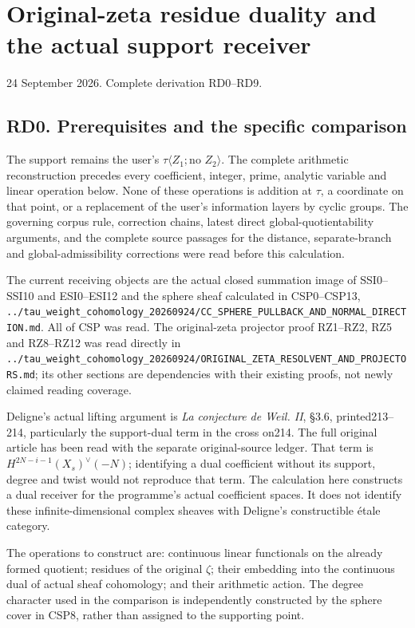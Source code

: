 \section{Original-zeta residue duality and the actual support
receiver}\label{original-zeta-residue-duality-and-the-actual-support-receiver}

24 September 2026. Complete derivation RD0--RD9.

\subsection{RD0. Prerequisites and the specific
comparison}\label{rd0.-prerequisites-and-the-specific-comparison}

The support remains the user's \(\tau\langle Z_1;\text{no }Z_2\rangle\).
The complete arithmetic reconstruction precedes every coefficient,
integer, prime, analytic variable and linear operation below. None of
these operations is addition at \(\tau\), a coordinate on that point, or
a replacement of the user's information layers by cyclic groups. The
governing corpus rule, correction chains, latest direct
global-quotientability arguments, and the complete source passages for
the distance, separate-branch and global-admissibility corrections were
read before this calculation.

The current receiving objects are the actual closed summation image of
SSI0--SSI10 and ESI0--ESI12 and the sphere sheaf calculated in
CSP0--CSP13,
\nolinkurl{../tau_weight_cohomology_20260924/CC_SPHERE_PULLBACK_AND_NORMAL_DIRECTION.md}.
All of CSP was read. The original-zeta projector proof RZ1--RZ2, RZ5 and
RZ8--RZ12 was read directly in
\nolinkurl{../tau_weight_cohomology_20260924/ORIGINAL_ZETA_RESOLVENT_AND_PROJECTORS.md};
its other sections are dependencies with their existing proofs, not
newly claimed reading coverage.

Deligne's actual lifting argument is \emph{La conjecture de Weil. II},
§3.6, printed213--214, particularly the support-dual term in the cross
on214. The full original article has been read with the separate
original-source ledger. That term is \(H^{2N-i-1}(X_s)^\vee(-N)\);
identifying a dual coefficient without its support, degree and twist
would not reproduce that term. The calculation here constructs a dual
receiver for the programme's actual coefficient spaces. It does not
identify these infinite-dimensional complex sheaves with Deligne's
constructible étale category.

The operations to construct are: continuous linear functionals on the
already formed quotient; residues of the original \(\zeta\); their
embedding into the continuous dual of actual sheaf cohomology; and their
arithmetic action. The degree character used in the comparison is
independently constructed by the sphere cover in CSP8, rather than
assigned to the supporting point.

